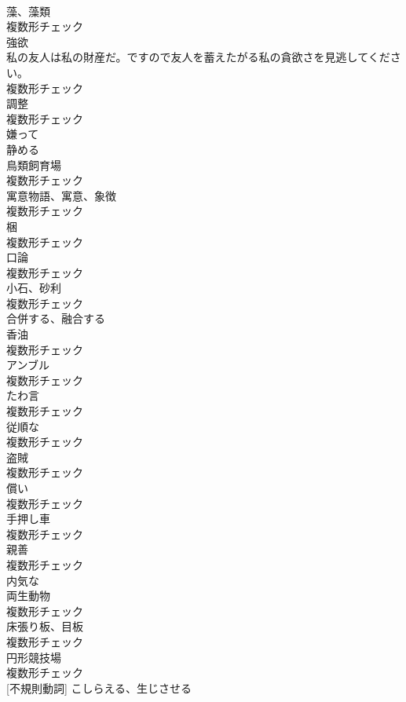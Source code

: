\documentclass[8pt]{extreport}
\begin{document}
\begin{CJK}{UTF8}{min}
\\	[名詞]	藻、藻類	
\\	複数形チェック
\\	[名詞]	強欲	
\\	私の友人は私の財産だ。ですので友人を蓄えたがる私の貪欲さを見逃してください。	
\\	複数形チェック
\\	[名詞]	調整	
\\	複数形チェック
\\	[形容詞]	嫌って	
\\	[動詞]	静める	
\\	[名詞]	鳥類飼育場	
\\	複数形チェック
\\	[名詞]	寓意物語、寓意、象徴	
\\	複数形チェック
\\	[名詞]	梱	
\\	複数形チェック
\\	[名詞]	口論	
\\	複数形チェック
\\	[名詞]	小石、砂利	
\\	複数形チェック
\\	[動詞]	合併する、融合する	
\\	[名詞]	香油	
\\	複数形チェック
\\	[名詞]	アンブル	
\\	複数形チェック
\\	[名詞]	たわ言	
\\	複数形チェック
\\	[名詞]	従順な	
\\	複数形チェック
\\	[名詞]	盗賊	
\\	複数形チェック
\\	[名詞]	償い	
\\	複数形チェック
\\	[名詞]	手押し車	
\\	複数形チェック
\\	[名詞]	親善	
\\	複数形チェック
\\	[形容詞]	内気な	
\\	[名詞]	両生動物	
\\	複数形チェック
\\	[名詞]	床張り板、目板	
\\	複数形チェック
\\	[名詞]	円形競技場	
\\	複数形チェック
\\	[動詞] [不規則動詞]	こしらえる、生じさせる	

\end{CJK}
\end{document}
